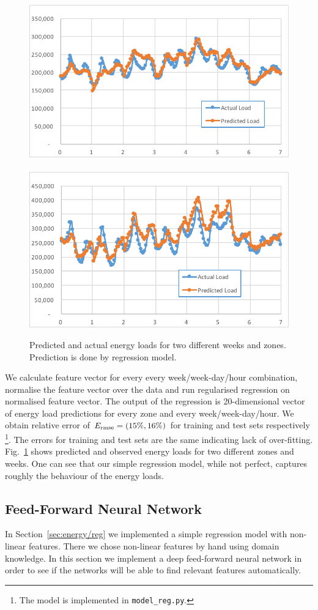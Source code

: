 \documentclass{article} %
\newcommand{\Ermse}{E_{\rm \scriptsize rmse}}
\begin{document}
\begin{figure}[h]
\begin{center}
\includegraphics[width=0.45\linewidth]{energy_reg1.pdf}	
\ \ \ 
\includegraphics[width=0.45\linewidth]{energy_reg2.pdf}	
\end{center}
\caption{Predicted and actual energy loads for two different weeks and zones.
Prediction is done by regression model.}
\label{fig:energy/reg}
\end{figure}
We calculate feature vector for every every week/week-day/hour 
combination, normalise the 
feature vector over the data and 
run regularised regression on normalised feature vector.
The output of the regression is 20-dimensional vector of energy load predictions
for every zone and every week/week-day/hour. 
We obtain relative error of $\Ermse=(15\%,16\%)$ 
for training and test sets respectively%
\footnote{
The model is implemented in {\tt model\_reg.py}.
}. 
The errors for training and test sets 
are the same indicating lack of over-fitting.
Fig.~\ref{fig:energy/reg} shows predicted and observed energy loads
for two different zones and weeks. One can see that our simple regression
model, while not perfect, captures roughly the behaviour of the 
energy loads.

\subsection{Feed-Forward Neural Network}
\label{sec:energy/nn}

In Section~\ref{sec:energy/reg} we implemented a simple regression model
with non-linear features. There we chose non-linear features by hand using
domain knowledge. In this section we implement a deep  feed-forward
neural network in order to see if the networks will be able to find 
relevant features automatically.
\end{document}
